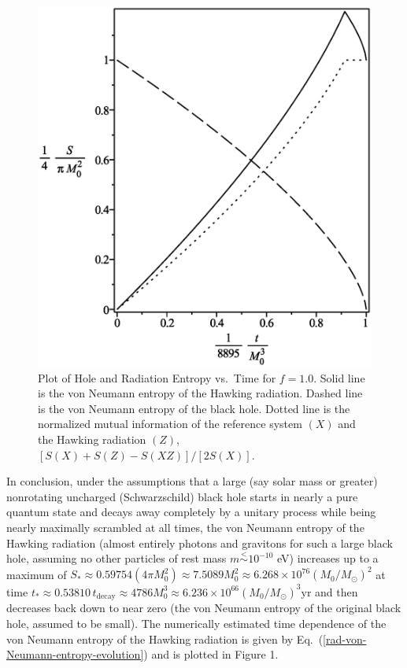 \documentclass[12pt]{article}
\begin{document}
\begin{figure}[H]
\centering
\includegraphics[width=1\textwidth]{Hawking-hole-radiation-mutual-entropy-vs-time-graph-10f-is-10.eps}
\caption{Plot of Hole and Radiation Entropy vs.\ Time for $f=1.0$.
Solid line is the von Neumann entropy of the Hawking radiation.
Dashed line is the von Neumann entropy of the black hole.
Dotted line is the normalized mutual information of the reference system $(X)$ and the Hawking radiation $(Z)$, $[S(X)+S(Z)-S(XZ)]/[2S(X)]$.}
\end{figure}


\newpage

\baselineskip 19pt

In conclusion, under the assumptions that a large (say solar mass or greater) nonrotating uncharged (Schwarzschild) black hole starts in nearly a pure quantum state and decays away completely by a unitary process while being nearly maximally scrambled at all times, the von Neumann entropy of the Hawking radiation (almost entirely photons and gravitons for such a large black hole, assuming no other particles of rest mass $m \stackrel{<}{\sim} 10^{-10}$ eV) increases up to a maximum of $S_\ast \approx 0.59754(4\pi M_0^2) \approx 7.5089 M_0^2 \approx 6.268\times 10^{76} (M_0/M_\odot)^2$ at time $t_\ast \approx 0.53810\, t_\mathrm{decay} \approx 4786 M_0^3 \approx 6.236\times 10^{66}(M_0/M_\odot)^3\mathrm{yr}$ and then decreases back down to near zero (the von Neumann entropy of the original black hole, assumed to be small).  The numerically estimated time dependence of the von Neumann entropy of the Hawking radiation is given by Eq.\ (\ref{rad-von-Neumann-entropy-evolution}) and is plotted in Figure 1.
\end{document}
